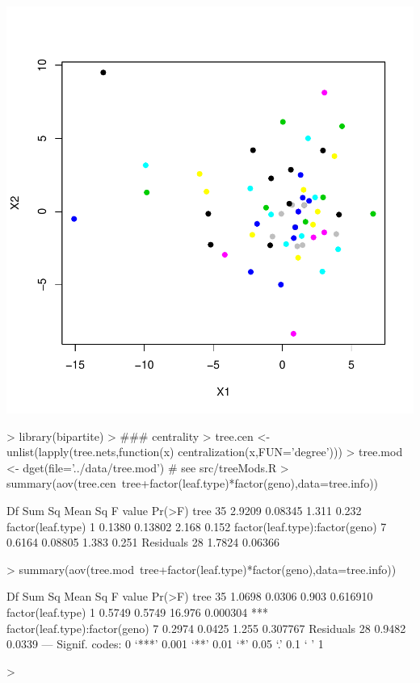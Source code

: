 \documentclass[12pt]{article}
\begin{document}
\includegraphics{notebook-006}

\begin{Schunk}
\begin{Sinput}
> library(bipartite)
> ### centrality
> tree.cen <- unlist(lapply(tree.nets,function(x) centralization(x,FUN='degree')))
> tree.mod <- dget(file='../data/tree.mod') # see src/treeMods.R
> summary(aov(tree.cen~tree+factor(leaf.type)*factor(geno),data=tree.info))
\end{Sinput}
\begin{Soutput}
                               Df Sum Sq Mean Sq F value Pr(>F)
tree                           35 2.9209 0.08345   1.311  0.232
factor(leaf.type)               1 0.1380 0.13802   2.168  0.152
factor(leaf.type):factor(geno)  7 0.6164 0.08805   1.383  0.251
Residuals                      28 1.7824 0.06366               
\end{Soutput}
\begin{Sinput}
> summary(aov(tree.mod~tree+factor(leaf.type)*factor(geno),data=tree.info))
\end{Sinput}
\begin{Soutput}
                               Df Sum Sq Mean Sq F value   Pr(>F)    
tree                           35 1.0698  0.0306   0.903 0.616910    
factor(leaf.type)               1 0.5749  0.5749  16.976 0.000304 ***
factor(leaf.type):factor(geno)  7 0.2974  0.0425   1.255 0.307767    
Residuals                      28 0.9482  0.0339                     
---
Signif. codes:  0 ‘***’ 0.001 ‘**’ 0.01 ‘*’ 0.05 ‘.’ 0.1 ‘ ’ 1
\end{Soutput}
\begin{Sinput}
> 
\end{Sinput}
\end{Schunk}
\end{document}
